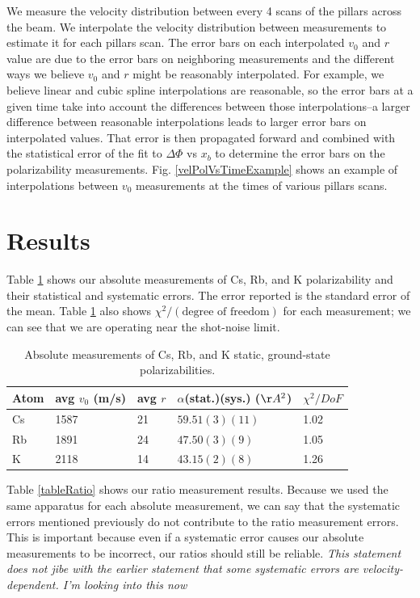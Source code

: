 \documentclass[twocolumn, prl,showpacs,superscriptaddress]{revtex4-1}   %
\newcommand{\figref}[1]{Fig. \ref{#1}}
\newcommand{\polK}{43.15(2)(8)}
\newcommand{\polRb}{47.50(3)(9)}
\newcommand{\polCs}{59.51(3)(11)}
\begin{document}
We measure the velocity distribution between every 4 scans of the pillars across the beam. We interpolate the velocity distribution between measurements to estimate it for each pillars scan. The error bars on each interpolated $v_0$ and $r$ value are due to the error bars on neighboring measurements and the different ways we believe $v_0$ and $r$ might be reasonably interpolated. For example, we believe linear and cubic spline interpolations are reasonable, so the error bars at a given time take into account the differences between those interpolations--a larger difference between reasonable interpolations leads to larger error bars on interpolated values. That error is then propagated forward and combined with the statistical error of the fit to $\Delta\Phi$ vs $x_b$ to determine the error bars on the polarizability measurements. \figref{velPolVsTimeExample} shows an example of interpolations between $v_0$ measurements at the times of various pillars scans.

\section{Results}

Table \ref{tableAbs} shows our absolute measurements of Cs, Rb, and K polarizability and their statistical and systematic errors. The error reported is the standard error of the mean. Table \ref{tableAbs} also shows $\chi^2/(\text{degree of freedom})$ for each measurement; we can see that we are operating near the shot-noise limit. 

\begingroup
\begin{table}
\caption{\label{tableAbs}Absolute measurements of Cs, Rb, and K static, ground-state polarizabilities.}
\begin{center}
\begin{tabular}{l l l l l}
\hline\hline
Atom & avg $v_0$ (m/s) & avg $r$ & $\alpha$(stat.)(sys.) ($\AA^2$) & $\chi^2/DoF$ \\
\hline
Cs & 1587 & 21 & $\polCs$ & 1.02 \\
Rb & 1891 & 24 & $\polRb$ & 1.05 \\
K  & 2118 & 14 & $\polK$ & 1.26 \\
\hline\hline
\end{tabular}
\end{center}
\end{table}
\endgroup

Table \ref{tableRatio} shows our ratio measurement results. Because we used the same apparatus for each absolute measurement, we can say that the systematic errors mentioned previously do not contribute to the ratio measurement errors. This is important because even if a systematic error causes our absolute measurements to be incorrect, our ratios should still be reliable. \textit{This statement does not jibe with the earlier statement that some systematic errors are velocity-dependent. I'm looking into this now} 
\end{document}
